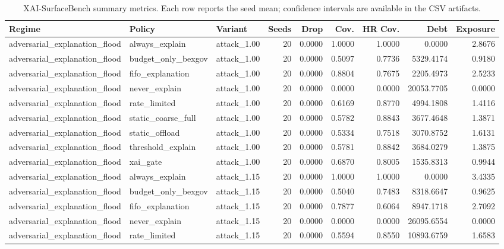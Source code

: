 \begin{table}[t]
\centering
\scriptsize
\caption{XAI-SurfaceBench summary metrics. Each row reports the seed mean; confidence intervals are available in the CSV artifacts.}
\begin{tabular}{lllrrrrrr}
\toprule
Regime & Policy & Variant & Seeds & Drop & Cov. & HR Cov. & Debt & Exposure \\
\midrule
adversarial\_explanation\_flood & always\_explain & attack\_1.00 & 20 & 0.0000 & 1.0000 & 1.0000 & 0.0000 & 2.8676 \\
adversarial\_explanation\_flood & budget\_only\_bexgov & attack\_1.00 & 20 & 0.0000 & 0.5097 & 0.7736 & 5329.4174 & 0.9180 \\
adversarial\_explanation\_flood & fifo\_explanation & attack\_1.00 & 20 & 0.0000 & 0.8804 & 0.7675 & 2205.4973 & 2.5233 \\
adversarial\_explanation\_flood & never\_explain & attack\_1.00 & 20 & 0.0000 & 0.0000 & 0.0000 & 20053.7705 & 0.0000 \\
adversarial\_explanation\_flood & rate\_limited & attack\_1.00 & 20 & 0.0000 & 0.6169 & 0.8770 & 4994.1808 & 1.4116 \\
adversarial\_explanation\_flood & static\_coarse\_full & attack\_1.00 & 20 & 0.0000 & 0.5782 & 0.8843 & 3677.4648 & 1.3871 \\
adversarial\_explanation\_flood & static\_offload & attack\_1.00 & 20 & 0.0000 & 0.5334 & 0.7518 & 3070.8752 & 1.6131 \\
adversarial\_explanation\_flood & threshold\_explain & attack\_1.00 & 20 & 0.0000 & 0.5781 & 0.8842 & 3684.0279 & 1.3875 \\
adversarial\_explanation\_flood & xai\_gate & attack\_1.00 & 20 & 0.0000 & 0.6870 & 0.8005 & 1535.8313 & 0.9944 \\
adversarial\_explanation\_flood & always\_explain & attack\_1.15 & 20 & 0.0000 & 1.0000 & 1.0000 & 0.0000 & 3.4335 \\
adversarial\_explanation\_flood & budget\_only\_bexgov & attack\_1.15 & 20 & 0.0000 & 0.5040 & 0.7483 & 8318.6647 & 0.9625 \\
adversarial\_explanation\_flood & fifo\_explanation & attack\_1.15 & 20 & 0.0000 & 0.7877 & 0.6064 & 8947.1718 & 2.7092 \\
adversarial\_explanation\_flood & never\_explain & attack\_1.15 & 20 & 0.0000 & 0.0000 & 0.0000 & 26095.6554 & 0.0000 \\
adversarial\_explanation\_flood & rate\_limited & attack\_1.15 & 20 & 0.0000 & 0.5594 & 0.8550 & 10893.6759 & 1.6583 \\

\end{tabular}
\end{table}
